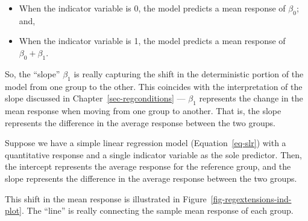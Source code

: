 \documentclass[
  letterpaper,
  DIV=11,
  numbers=noendperiod]{scrreprt}
\providecommand{\tightlist}{%
  \setlength{\itemsep}{0pt}\setlength{\parskip}{0pt}}\usepackage{longtable,booktabs,array}
\theoremstyle{definition}
\theoremstyle{definition}
\theoremstyle{plain}
\theoremstyle{remark}
\begin{document}
\begin{itemize}
\tightlist
\item
  When the indicator variable is 0, the model predicts a mean response
  of \(\beta_0\); and,
\item
  When the indicator variable is 1, the model predicts a mean response
  of \(\beta_0 + \beta_1\).
\end{itemize}

So, the ``slope'' \(\beta_1\) is really capturing the shift in the
deterministic portion of the model from one group to the other. This
coincides with the interpretation of the slope discussed in
Chapter~\ref{sec-regconditions} --- \(\beta_1\) represents the change in
the mean response when moving from one group to another. That is, the
slope represents the difference in the average response between the two
groups.

\begin{tcolorbox}[enhanced jigsaw, colbacktitle=quarto-callout-note-color!10!white, colback=white, left=2mm, title=\textcolor{quarto-callout-note-color}{\faInfo}\hspace{0.5em}{Interpretation of the Parameters}, toptitle=1mm, leftrule=.75mm, breakable, bottomrule=.15mm, arc=.35mm, rightrule=.15mm, toprule=.15mm, coltitle=black, opacityback=0, colframe=quarto-callout-note-color-frame, opacitybacktitle=0.6, bottomtitle=1mm, titlerule=0mm]

Suppose we have a simple linear regression model (Equation~\ref{eq-slr})
with a quantitative response and a single indicator variable as the sole
predictor. Then, the intercept represents the average response for the
reference group, and the slope represents the difference in the average
response between the two groups.

\end{tcolorbox}

This shift in the mean response is illustrated in
Figure~\ref{fig-regextensions-ind-plot}. The ``line'' is really
connecting the sample mean response of each group.
\end{document}
